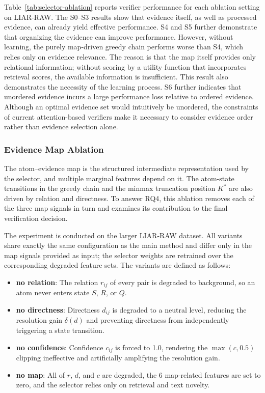 \documentclass[letterpaper]{article}
\begin{document}
Table~\ref{tab:selector-ablation} reports verifier performance for each ablation setting on LIAR-RAW. The S0--S3 results show that evidence itself, as well as processed evidence, can already yield effective performance. S4 and S5 further demonstrate that organizing the evidence can improve performance. However, without learning, the purely map-driven greedy chain performs worse than S4, which relies only on evidence relevance. The reason is that the map itself provides only relational information; without scoring by a utility function that incorporates retrieval scores, the available information is insufficient. This result also demonstrates the necessity of the learning process. S6 further indicates that unordered evidence incurs a large performance loss relative to ordered evidence. Although an optimal evidence set would intuitively be unordered, the constraints of current attention-based verifiers make it necessary to consider evidence order rather than evidence selection alone.

\subsubsection{Evidence Map Ablation}

The atom--evidence map is the structured intermediate representation used by the selector, and multiple marginal features depend on it. The atom-state transitions in the greedy chain and the minmax truncation position $K^\ast$ are also driven by relation and directness. To answer RQ4, this ablation removes each of the three map signals in turn and examines its contribution to the final verification decision.

The experiment is conducted on the larger LIAR-RAW dataset. All variants share exactly the same configuration as the main method and differ only in the map signals provided as input; the selector weights are retrained over the corresponding degraded feature sets. The variants are defined as follows:

\begin{itemize}
\item \textbf{no relation}: The relation $r_{ij}$ of every pair is degraded to background, so an atom never enters state $S$, $R$, or $Q$.
\item \textbf{no directness}: Directness $d_{ij}$ is degraded to a neutral level, reducing the resolution gain $\delta(d)$ and preventing directness from independently triggering a state transition.
\item \textbf{no confidence}: Confidence $c_{ij}$ is forced to 1.0, rendering the $\max(c,0.5)$ clipping ineffective and artificially amplifying the resolution gain.
\item \textbf{no map}: All of $r$, $d$, and $c$ are degraded, the 6 map-related features are set to zero, and the selector relies only on retrieval and text novelty.
\end{itemize}
\end{document}
